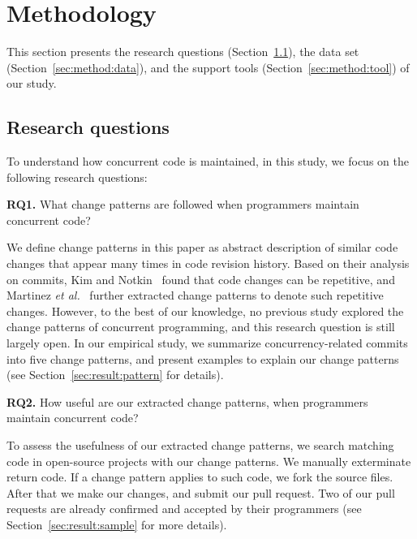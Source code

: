 \section{Methodology}
\label{sec:method}
This section presents the research questions (Section~\ref{sec:method:rq}), the data set (Section~\ref{sec:method:data}), and the support tools (Section~\ref{sec:method:tool}) of our study.
\subsection{Research questions}
\label{sec:method:rq}
To understand how concurrent code is maintained, in this study, we focus on the following research questions:

\textbf{RQ1.} What change patterns are followed when programmers maintain concurrent code?

We define change patterns in this paper as abstract description of similar code changes that appear many times in code revision history. Based on their analysis on commits, Kim and Notkin~\cite{conf/icse/KimN09} found that code changes can be repetitive, and Martinez \emph{et al.}~\cite{conf/icsm/MartinezDM13} further extracted change patterns to denote such repetitive changes. However, to the best of our knowledge, no previous study explored the change patterns of concurrent programming, and this research question is still largely open. In our empirical study, we summarize concurrency-related commits into five change patterns, and present examples to explain our change patterns (see Section~\ref{sec:result:pattern} for details).

\textbf{RQ2.} How useful are our extracted change patterns, when programmers maintain concurrent code?

To assess the usefulness of our extracted change patterns, we search matching code in open-source projects with our change patterns. We manually exterminate return code. If a change pattern applies to such code, we fork the source files. After that we make our changes, and submit our pull request. Two of our pull requests are already confirmed and accepted by their programmers (see Section~\ref{sec:result:sample} for more details).



